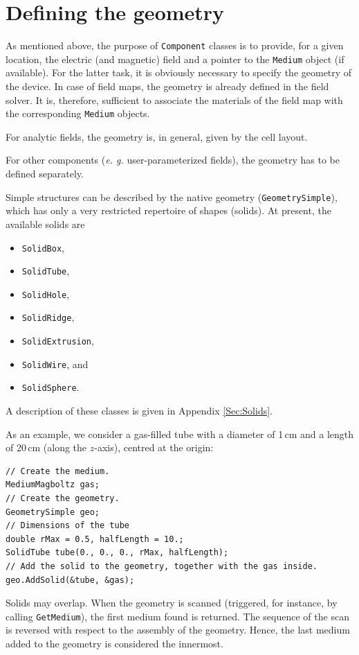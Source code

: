 \section{Defining the geometry}

As mentioned above, the purpose of \texttt{Component} classes is to 
provide, for a given location, the electric (and magnetic) field and a pointer to the 
\texttt{Medium} object (if available).
For the latter task, it is obviously necessary to specify the geometry 
of the device. 
In case of field maps, the geometry is already defined in the field solver. 
It is, therefore, sufficient to associate the materials 
of the field map with the corresponding \texttt{Medium} objects. 

For analytic fields, the geometry is, in general, given by the 
cell layout.

For other components (\textit{e. g.} user-parameterized fields), 
the geometry has to be defined separately. 

Simple structures can be described by the native geometry (\texttt{GeometrySimple}), which has only a very restricted repertoire of shapes (solids). 
At present, the available solids are
\begin{itemize}
  \item
  \texttt{SolidBox}, 
  \item
  \texttt{SolidTube}, 
  \item
  \texttt{SolidHole}, 
  \item
  \texttt{SolidRidge},
  \item
  \texttt{SolidExtrusion}, 
  \item
  \texttt{SolidWire}, and
  \item
  \texttt{SolidSphere}.
\end{itemize} 
A description of these classes is given in Appendix \ref{Sec:Solids}.

As an example, we consider a gas-filled tube with a diameter of 1\,cm and 
a length of 20\,cm (along the \(z\)-axis), centred at the origin:
\begin{lstlisting}
// Create the medium.
MediumMagboltz gas;
// Create the geometry.
GeometrySimple geo;
// Dimensions of the tube
double rMax = 0.5, halfLength = 10.;
SolidTube tube(0., 0., 0., rMax, halfLength);
// Add the solid to the geometry, together with the gas inside.
geo.AddSolid(&tube, &gas);
\end{lstlisting}

Solids may overlap. 
When the geometry is scanned 
(triggered, for instance, by calling \texttt{GetMedium}), the  
first medium found is returned. 
The sequence of the scan is reversed with respect to the 
assembly of the geometry. 
Hence, the last medium added to the geometry is considered the innermost. 

